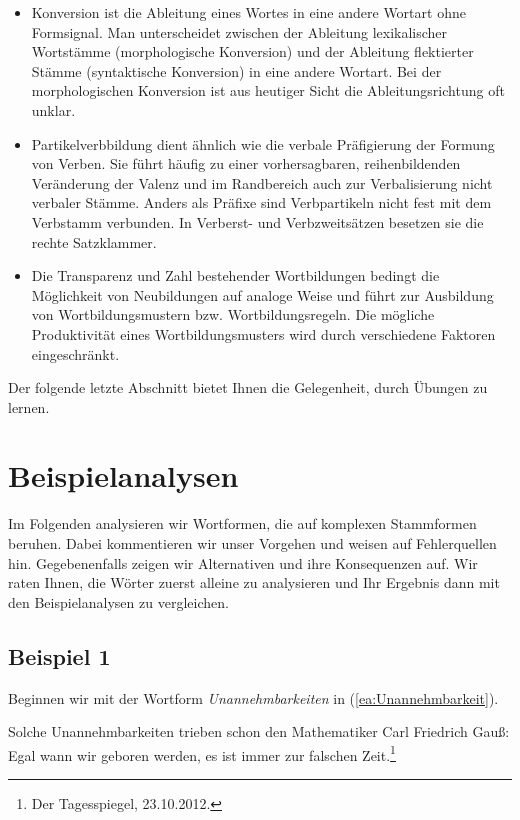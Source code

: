 \begin{itemize}
\item Konversion ist die Ableitung eines Wortes in eine andere Wortart ohne Formsignal. Man unterscheidet zwischen der Ableitung lexikalischer Wortstämme (morphologische Konversion) und der Ableitung flektierter Stämme (syntaktische Konversion) in eine andere Wortart. Bei der morphologischen Konversion ist aus heutiger Sicht die Ableitungsrichtung oft unklar.

\item Partikelverbbildung dient ähnlich wie die verbale Präfigierung der Formung von Verben. Sie führt häufig zu einer vorhersagbaren, reihenbildenden Veränderung der Valenz und im Randbereich auch zur Verbalisierung nicht verbaler Stämme. Anders als Präfixe sind Verbpartikeln nicht fest mit dem Verbstamm verbunden. In Verberst- und Verbzweitsätzen besetzen sie die rechte Satzklammer.

\item Die Transparenz und Zahl bestehender Wortbildungen bedingt die Möglichkeit von Neubildungen auf analoge Weise und führt zur Ausbildung von Wortbildungsmustern bzw. Wortbildungsregeln. Die mögliche Produktivität eines Wortbildungsmusters wird durch verschiedene Faktoren eingeschränkt.

\end{itemize}

Der folgende letzte Abschnitt bietet Ihnen die Gelegenheit, durch Übungen zu lernen.

\section{Beispielanalysen}\label{section:BspAnalysenWB}

Im Folgenden analysieren wir Wortformen, die auf komplexen Stammformen beruhen. Dabei kommentieren wir unser Vorgehen und weisen auf Fehlerquellen hin. Gegebenenfalls zeigen wir Alternativen und ihre Konsequenzen auf. Wir raten Ihnen, die Wörter zuerst alleine zu analysieren und Ihr Ergebnis dann mit den Beispielanalysen zu vergleichen. 

\subsection{Beispiel 1}\label{subsection:Bsp1Wb}

Beginnen wir mit der Wortform \textit{Unannehmbarkeiten} in (\ref{ea:Unannehmbarkeit}).

\ea \label{ea:Unannehmbarkeit} Solche Unannehmbarkeiten trieben schon den Mathematiker Carl Friedrich Gauß: Egal wann wir geboren werden, es ist immer zur falschen Zeit.\footnote{Der Tagesspiegel, 23.10.2012.}
\z 

